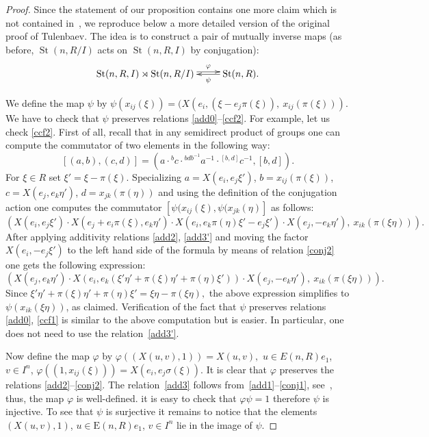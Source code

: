 \documentclass[11pt]{amsart}
\theoremstyle{plain} \declaretheorem[name=Theorem, Refname={Theorem,Theorems}]{tm} \Crefname{tm}{Theorem}{Theorems}
\numberwithin{equation}{section}
\theoremstyle{definition} \newtheorem{df}[lm]{Definition} \Crefname{df}{Definition}{Definitions}
\theoremstyle{remark} \newtheorem{rk}[lm]{Remark} \Crefname{rk}{Remark}{Remarks}
\newcommand{\E}{{\mathrm{E}}}
\newcommand{\St}{\mathop{\mathrm{St}}\nolimits}
\begin{document}
\begin{proof} 
Since the statement of our proposition contains one more claim which is not contained in~\cite[Proposition~1.6]{Tul}, we reproduce below a more detailed version of the original proof of Tulenbaev.
The idea is to construct a pair of mutually inverse maps (as before, $\St(n, R/I)$ acts on $\St(n,R,I)$ by conjugation):
$$\xymatrix{ \St(n, R, I) \rtimes \St(n, R/I) \ar@<0.6ex>[r]^-\varphi &  \ar[l]^-\psi \St(n, R).}$$

We define the map $\psi$ by $\psi(x_{ij}(\xi)) = (X(e_i, (\xi - e_j\pi(\xi)),\ x_{ij}(\pi(\xi)))$. 
We have to check that $\psi$ preserves relations \eqref{add0}--\eqref{ccf2}.
For example, let us check \eqref{ccf2}. 
First of all, recall that in any semidirect product of groups one can compute the commutator of two elements in the following way:
$$[(a, b), (c, d)] = (a \cdot {}^bc \cdot {}^{bdb^{-1}}a^{-1} \cdot {}^{[b, d]}c^{-1} , [b, d]).$$
For $\xi\in R$ set $\xi' = \xi - \pi(\xi)$.
Specializing $a = X(e_i,  e_j\xi')$, $b = x_{ij}(\pi(\xi))$, $c = X(e_j, e_k\eta')$, $d = x_{jk}(\pi(\eta))$ and using the definition of the conjugation action 
one computes the commutator $[\psi(x_{ij}(\xi), \psi(x_{jk}(\eta)]$ as follows:
\setcounter{equation}{2}
\begin{equation} \left(X(e_i,  e_j\xi') \cdot X(e_j + e_i\pi(\xi), e_k\eta') \cdot X(e_i,  e_k\pi(\eta)\xi' -  e_j\xi') \cdot X(e_j, -e_k\eta'),\ x_{ik}(\pi(\xi\eta))\right). \label{eq:proofS3}\end{equation}
\setcounter{lm}{3}
After applying additivity relations \eqref{add2}, \eqref{add3'} and moving the factor $X(e_i, - e_j\xi')$ to the left hand side of the formula by means of relation \eqref{conj2}
one gets the following expression:
$$\left(X(e_j, e_k\eta') \cdot X(e_i, e_k(\xi' \eta' + \pi(\xi)\eta' + \pi(\eta)\xi')) \cdot X(e_j, -e_k\eta'),\ x_{ik}(\pi(\xi\eta))\right).$$
Since $\xi'\eta' + \pi(\xi)\eta' + \pi(\eta)\xi' = \xi\eta - \pi(\xi\eta),$ the above expression simplifies to $\psi(x_{ik}(\xi\eta))$, as claimed.
Verification of the fact that $\psi$ preserves relations \eqref{add0}, \eqref{ccf1} is similar to the above computation but is easier.
In particular, one does not need to use the relation~\eqref{add3'}.

Now define the map $\varphi$ by $\varphi\left((X(u, v), 1)\right) = X(u, v),$ $u\in E(n, R)e_1$, $v\in I^n$, $\varphi\left((1, x_{ij}(\xi))\right) = X(e_i, e_j\sigma(\xi))$.
It is clear that $\varphi$ preserves the relations \eqref{add2}--\eqref{conj2}. The relation~\eqref{add3} follows from~\eqref{add1}--\ref{conj1}, see~\cite[(1.3)]{Tul}, thus, the map $\varphi$ is well-defined.
it is easy to check that $\varphi\psi=1$ therefore $\psi$ is injective. To see that $\psi$ is surjective it remains to notice that the elements $(X(u,v), 1)$, $u\in \E(n, R)e_1$, $v\in I^n$ lie in the image of $\psi$.
\end{proof}
\end{document}
